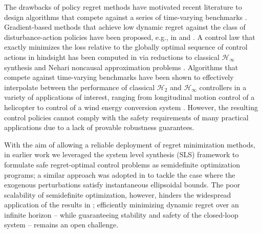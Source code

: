 \documentclass[conference]{IEEEtran}
\begin{document}
The drawbacks of policy regret methods have motivated recent literature to design algorithms that compete against a series of time-varying benchmarks \cite{zinkevich2003online}. Gradient-based methods that achieve low dynamic regret against the class of disturbance-action policies have been proposed, e.g., in \cite{zhao2020dynamic} and \cite{zhou2023efficient}. A control law that exactly minimizes the loss relative to the globally optimal sequence of control actions in hindsight has been computed in \cite{goel2023regret, sabag2021regret} via reductions to classical $\mathcal{H}_\infty$ synthesis and Nehari noncausal approximation problems \cite{nehari1957bounded}. Algorithms that compete against time-varying benchmarks have been shown to effectively interpolate between the performance of classical $\mathcal{H}_2$ and $\mathcal{H}_\infty$ controllers in a variety of applications of interest, ranging from longitudinal motion control of a helicopter to control of a wind energy conversion system \cite{sabag2022optimal}. However, the resulting control policies cannot comply with the safety requirements of many practical applications due to a lack of provable robustness guarantees.

With the aim of allowing a reliable deployment of regret minimization methods, in earlier work \cite{martin2022safe} we leveraged the system level synthesis (SLS) framework \cite{wang2019system} to formulate safe regret-optimal control problems as semidefinite optimization programs; a similar approach was adopted in \cite{didier2022system} to tackle the case where the exogenous perturbations satisfy instantaneous ellipsoidal bounds. The poor scalability of semidefinite optimization, however, hinders the widespread application of the results in \cite{martin2022safe, didier2022system, didier2022generalised, martin2022follow, martin2023regret}; efficiently minimizing dynamic regret over an infinite
horizon – while guaranteeing stability and safety of the closed-loop system – remains an open challenge.
\end{document}
